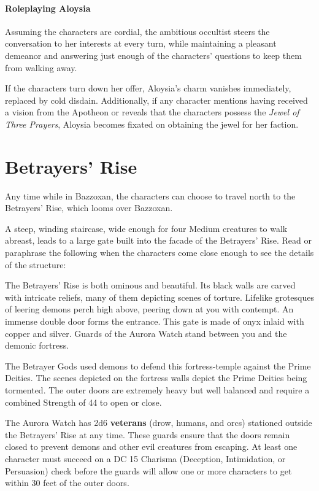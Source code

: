 \documentclass[a4paper, 11pt, bg=full, twocolumn, nooutline]{dndbook}
\begin{document}
\paragraph{Roleplaying Aloysia}

Assuming the characters are cordial, the ambitious occultist steers the conversation to her interests at every turn, while maintaining a pleasant demeanor and answering just enough of the characters' questions to keep them from walking away.

If the characters turn down her offer, Aloysia's charm vanishes immediately, replaced by cold disdain. Additionally, if any character mentions having received a vision from the Apotheon or reveals that the characters possess the \textit{Jewel of Three Prayers}, Aloysia becomes fixated on obtaining the jewel for her faction.
\section{Betrayers' Rise}

Any time while in Bazzoxan, the characters can choose to travel north to the Betrayers' Rise, which looms over Bazzoxan.

A steep, winding staircase, wide enough for four Medium creatures to walk abreast, leads to a large gate built into the facade of the Betrayers' Rise. Read or paraphrase the following when the characters come close enough to see the details of the structure:

\begin{DndReadAloud}
The Betrayers' Rise is both ominous and beautiful. Its black walls are carved with intricate reliefs, many of them depicting scenes of torture. Lifelike grotesques of leering demons perch high above, peering down at you with contempt.
An immense double door forms the entrance. This gate is made of onyx inlaid with copper and silver. Guards of the Aurora Watch stand between you and the demonic fortress.
\end{DndReadAloud}

The Betrayer Gods used demons to defend this fortress-temple against the Prime Deities. The scenes depicted on the fortress walls depict the Prime Deities being tormented. The outer doors are extremely heavy but well balanced and require a combined Strength of 44 to open or close.

The Aurora Watch has 2d6 \textbf{veterans} (drow, humans, and orcs) stationed outside the Betrayers' Rise at any time. These guards ensure that the doors remain closed to prevent demons and other evil creatures from escaping. At least one character must succeed on a DC 15 Charisma (Deception, Intimidation, or Persuasion) check before the guards will allow one or more characters to get within 30 feet of the outer doors.
\end{document}
